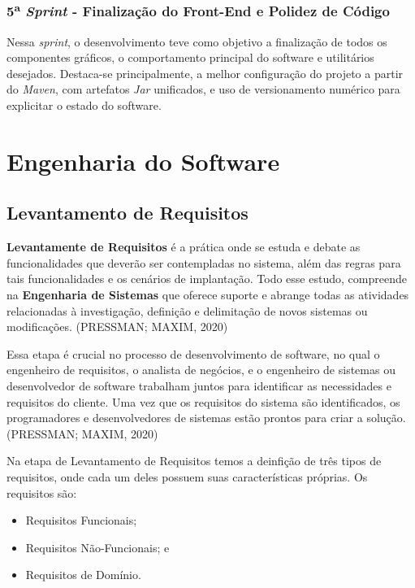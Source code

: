 \documentclass[a4paper,12pt]{article}
\begin{document}
\subsubsection{5\textsuperscript{a} \textit{Sprint} - Finalização do Front-End e Polidez de Código}
Nessa \textit{sprint}, o desenvolvimento teve como objetivo a finalização de todos os componentes gráficos, o comportamento principal do software e utilitários desejados. Destaca-se principalmente, a melhor configuração do projeto a partir do \textit{Maven}, com artefatos \textit{Jar} unificados, e uso de versionamento numérico para explicitar o estado do software.


\pagebreak
\section{Engenharia do Software}
\subsection{Levantamento de Requisitos}
\textbf{Levantamente de Requisitos} é a prática onde se estuda e debate as funcionalidades que deverão ser contempladas no sistema, 
além das regras para tais funcionalidades e os cenários de implantação. Todo esse estudo, compreende na \textbf{Engenharia de Sistemas} 
que oferece suporte e abrange todas as atividades relacionadas à investigação, definição e delimitação de novos sistemas ou modificações.
(PRESSMAN; MAXIM, 2020)

Essa etapa é crucial no processo de desenvolvimento de software, no qual o engenheiro de requisitos, o analista de negócios, e 
o engenheiro de sistemas ou desenvolvedor de software trabalham juntos para identificar as necessidades e requisitos do cliente. Uma 
vez que os requisitos do sistema são identificados, os programadores e desenvolvedores de sistemas estão prontos para criar a solução. (PRESSMAN; MAXIM, 2020)

Na etapa de Levantamento de Requisitos temos a deinfição de três tipos de requisitos, onde cada um deles possuem suas 
características próprias. Os requisitos são:
\begin{itemize}
	\item Requisitos Funcionais;
	\item Requisitos Não-Funcionais; e
	\item Requisitos de Domínio.
\end{itemize}
\end{document}
